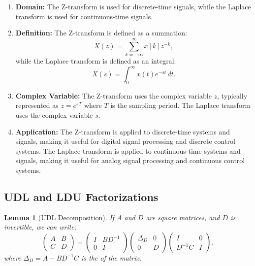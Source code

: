 \documentclass[a4 paper]{article}
\numberwithin{equation}{section}
\theoremstyle{boldStyle}
\theoremstyle{boldBlueStyle}
\newtheorem{lemma}{Lemma}[section]
\theoremstyle{boldPurpleStyle}
\theoremstyle{boldRedStyle}
\theoremstyle{boldGreenStyle}
\begin{document}
\begin{enumerate}
  \item \textbf{Domain:}
  The Z-transform is used for discrete-time signals, while the Laplace transform is used for continuous-time signals.

  \item \textbf{Definition:}
  The Z-transform is defined as a summation:
  \[
  X(z) = \sum_{k=-\infty}^{\infty} x[k] z^{-k},
  \]
  while the Laplace transform is defined as an integral:
  \[
  X(s) = \int_{0}^{\infty} x(t) e^{-st} \, dt.
  \]

  \item \textbf{Complex Variable:}
  The Z-transform uses the complex variable \( z \), typically represented as \( z = e^{sT} \) where \( T \) is the sampling period. The Laplace transform uses the complex variable \( s \).

  \item \textbf{Application:}
  The Z-transform is applied to discrete-time systems and signals, making it useful for digital signal processing and discrete control systems. The Laplace transform is applied to continuous-time systems and signals, making it useful for analog signal processing and continuous control systems.
\end{enumerate}











\newpage
\subsection{UDL and LDU Factorizations}


\begin{lemma}[UDL Decomposition]
  If \( A \) and \( D \) are square matrices, and \( D \) is invertible, we can write:
  \[
  \begin{pmatrix}
  A & B \\
  C & D
  \end{pmatrix} =
  \begin{pmatrix}
  I & BD^{-1} \\
  0 & I
  \end{pmatrix}
  \begin{pmatrix}
  \Delta_D & 0 \\
  0 & D
  \end{pmatrix}
  \begin{pmatrix}
  I & 0 \\
  D^{-1}C & I
  \end{pmatrix},
  \]
  where \( \Delta_D = A - BD^{-1}C \) is the  of the matrix.
\end{lemma}
\end{document}
